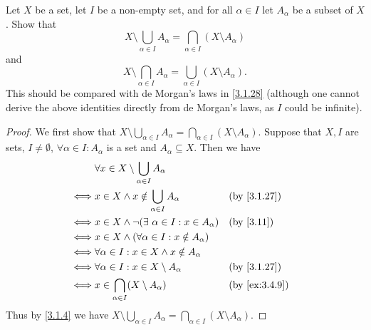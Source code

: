 \begin{ex}\label{ex:3.4.11}
  Let \(X\) be a set, let \(I\) be a non-empty set, and for all \(\alpha \in I\) let \(A_{\alpha}\) be a subset of \(X\).
  Show that
  \[
    X \setminus \bigcup_{\alpha \in I} A_{\alpha} = \bigcap_{\alpha \in I} (X \setminus A_{\alpha})
  \]
  and
  \[
    X \setminus \bigcap_{\alpha \in I} A_{\alpha} = \bigcup_{\alpha \in I} (X \setminus A_{\alpha}).
  \]
  This should be compared with de Morgan's laws in \cref{3.1.28}
  (although one cannot derive the above identities directly from de Morgan's laws, as \(I\) could be infinite).
\end{ex}

\begin{proof}
  We first show that \(X \setminus \bigcup_{\alpha \in I} A_{\alpha} = \bigcap_{\alpha \in I} (X \setminus A_{\alpha})\).
  Suppose that \(X, I\) are sets, \(I \neq \emptyset\), \(\forall \alpha \in I : A_{\alpha}\) is a set and \(A_{\alpha} \subseteq X\).
  Then we have
  \begin{align*}
         & \forall x \in X \setminus \bigcup_{\alpha \in I} A_{\alpha}                                    \\
    \iff & x \in X \land x \notin \bigcup_{\alpha \in I} A_{\alpha}      &  & \text{(by \cref{3.1.27})}   \\
    \iff & x \in X \land \lnot(\exists\ \alpha \in I : x \in A_{\alpha}) &  & \text{(by \cref{3.11})}     \\
    \iff & x \in X \land (\forall \alpha \in I : x \notin A_{\alpha})                                     \\
    \iff & \forall \alpha \in I : x \in X \land x \notin A_{\alpha}                                       \\
    \iff & \forall \alpha \in I : x \in X \setminus A_{\alpha}           &  & \text{(by \cref{3.1.27})}   \\
    \iff & x \in \bigcap_{\alpha \in I} (X \setminus A_{\alpha})         &  & \text{(by \cref{ex:3.4.9})} \\
  \end{align*}
  Thus by \cref{3.1.4} we have \(X \setminus \bigcup_{\alpha \in I} A_{\alpha} = \bigcap_{\alpha \in I} (X \setminus A_{\alpha})\).


\end{proof}

